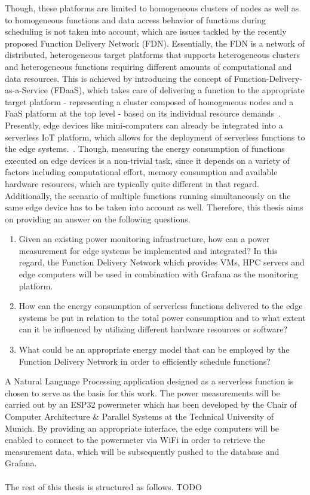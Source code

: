 Though, these platforms are limited to homogeneous clusters of nodes as well as to homogeneous functions and data access behavior of functions during scheduling is not taken into account, which are issues tackled by the recently proposed Function Delivery Network (FDN). Essentially, the FDN is a network of distributed, heterogeneous target platforms that supports heterogeneous clusters and heterogeneous functions requiring different amounts of computational and data resources. This is achieved by introducing the concept of Function-Delivery-as-a-Service (FDaaS), which takes care of delivering a function to the appropriate target platform - representing a cluster composed of homogeneous nodes and a FaaS platform at the top level - based on its individual resource demands~\parencite{fdn}. \\
Presently, edge devices like mini-computers can already be integrated into a serverless IoT platform, which allows for the deployment of serverless functions to the edge systems.~\parencite{fdn}. Though, measuring the energy consumption of functions executed on edge devices is a non-trivial task, since it depends on a variety of factors including computational effort, memory consumption and available hardware resources, which are typically quite different in that regard. Additionally, the scenario of multiple functions running simultaneously on the same edge device has to be taken into account as well. Therefore, this thesis aims on providing an answer on the following questions.

\begin{enumerate}
  \item Given an existing power monitoring infrastructure, how can a power measurement for edge systems be implemented and integrated? In this regard, the Function Delivery Network which provides VMs, HPC servers and edge computers will be used in combination with Grafana as the monitoring platform.
  \item How can the energy consumption of serverless functions delivered to the edge systems be put in relation to the total power consumption and to what extent can it be influenced by utilizing different hardware resources or software?
  \item What could be an appropriate energy model that can be employed by the Function Delivery Network in order to efficiently schedule functions?
\end{enumerate}

A Natural Language Processing application designed as a serverless function is chosen to serve as the basis for this work. The power measurements will be carried out by an ESP32 powermeter which has been developed by the Chair of Computer Architecture \& Parallel Systems at the Technical University of Munich. By providing an appropriate interface, the edge computers will be enabled to connect to the powermeter via WiFi in order to retrieve the measurement data, which will be subsequently pushed to the database and Grafana.
\\
\\
The rest of this thesis is structured as follows. TODO